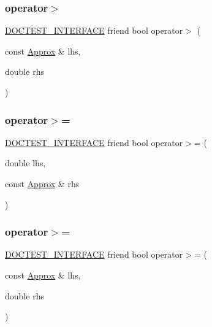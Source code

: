 \subsubsection{\texorpdfstring{operator$>$}{operator>}\hspace{0.1cm}{\footnotesize\ttfamily [2/2]}}
{\footnotesize\ttfamily \mbox{\hyperlink{doctest_8h_a9c16ffc635ec47f07797d21ede26b1a5}{D\+O\+C\+T\+E\+S\+T\+\_\+\+I\+N\+T\+E\+R\+F\+A\+CE}} friend bool operator$>$ (\begin{DoxyParamCaption}\item[{const \mbox{\hyperlink{classdoctest_1_1_approx}{Approx}} \&}]{lhs,  }\item[{double}]{rhs }\end{DoxyParamCaption})\hspace{0.3cm}{\ttfamily [friend]}}

\mbox{\label{classdoctest_1_1_approx_acf882dbff26c57cd8404da3edd46f45e}} 
\subsubsection{\texorpdfstring{operator$>$=}{operator>=}\hspace{0.1cm}{\footnotesize\ttfamily [1/2]}}
{\footnotesize\ttfamily \mbox{\hyperlink{doctest_8h_a9c16ffc635ec47f07797d21ede26b1a5}{D\+O\+C\+T\+E\+S\+T\+\_\+\+I\+N\+T\+E\+R\+F\+A\+CE}} friend bool operator$>$= (\begin{DoxyParamCaption}\item[{double}]{lhs,  }\item[{const \mbox{\hyperlink{classdoctest_1_1_approx}{Approx}} \&}]{rhs }\end{DoxyParamCaption})\hspace{0.3cm}{\ttfamily [friend]}}

\mbox{\label{classdoctest_1_1_approx_a52e1bcec19171f0ec55cc3a280188a03}} 
\subsubsection{\texorpdfstring{operator$>$=}{operator>=}\hspace{0.1cm}{\footnotesize\ttfamily [2/2]}}
{\footnotesize\ttfamily \mbox{\hyperlink{doctest_8h_a9c16ffc635ec47f07797d21ede26b1a5}{D\+O\+C\+T\+E\+S\+T\+\_\+\+I\+N\+T\+E\+R\+F\+A\+CE}} friend bool operator$>$= (\begin{DoxyParamCaption}\item[{const \mbox{\hyperlink{classdoctest_1_1_approx}{Approx}} \&}]{lhs,  }\item[{double}]{rhs }\end{DoxyParamCaption})\hspace{0.3cm}{\ttfamily [friend]}}

